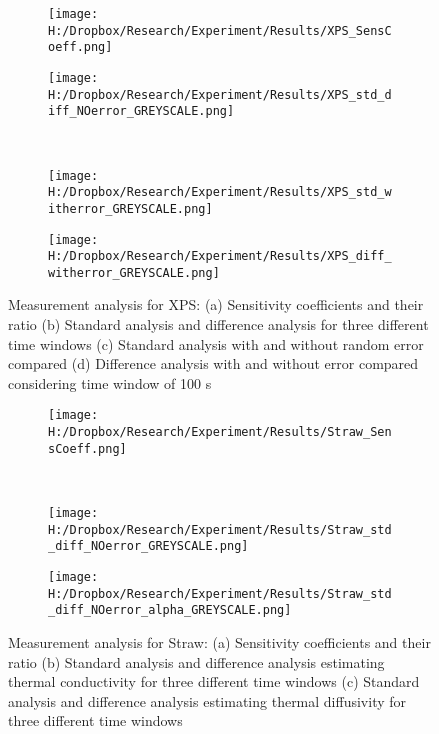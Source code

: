 \documentclass[12pt]{report}
\begin{document}
\begin{figure}
\begin{subfigure}{.5\textwidth}
\centering
\texttt{[image: H:/Dropbox/Research/Experiment/Results/XPS\_SensCoeff.png]}
\caption{}
\end{subfigure}\hfill
\begin{subfigure}{.5\textwidth}
\centering
\texttt{[image: H:/Dropbox/Research/Experiment/Results/XPS\_std\_diff\_NOerror\_GREYSCALE.png]}
\caption{}
\end{subfigure}\\
\begin{subfigure}{.5\textwidth}
\centering
\texttt{[image: H:/Dropbox/Research/Experiment/Results/XPS\_std\_witherror\_GREYSCALE.png]}
\caption{}
\end{subfigure}\hfill
\begin{subfigure}{.5\textwidth}
\centering
\texttt{[image: H:/Dropbox/Research/Experiment/Results/XPS\_diff\_witherror\_GREYSCALE.png]}
\caption{}
\end{subfigure}
\caption{Measurement analysis for XPS: (a) Sensitivity coefficients and their ratio (b) Standard analysis and difference analysis for three different time windows (c) Standard analysis with and without random error compared (d) Difference analysis with and without error compared considering time window of 100 s}

\end{figure}


\begin{figure}
\begin{subfigure}{1\textwidth}
\centering
\texttt{[image: H:/Dropbox/Research/Experiment/Results/Straw\_SensCoeff.png]}
\caption{}
\end{subfigure}\\
\begin{subfigure}{.5\textwidth}
\centering
\texttt{[image: H:/Dropbox/Research/Experiment/Results/Straw\_std\_diff\_NOerror\_GREYSCALE.png]}
\caption{}
\end{subfigure}\hfill
\begin{subfigure}{.5\textwidth}
\centering
\texttt{[image: H:/Dropbox/Research/Experiment/Results/Straw\_std\_diff\_NOerror\_alpha\_GREYSCALE.png]}
\caption{}
\end{subfigure}
\caption{Measurement analysis for Straw: (a) Sensitivity coefficients and their ratio (b) Standard analysis and difference analysis estimating thermal conductivity for three different time windows (c) Standard analysis and difference analysis estimating thermal diffusivity for three different time windows}

\end{figure}
\end{document}
